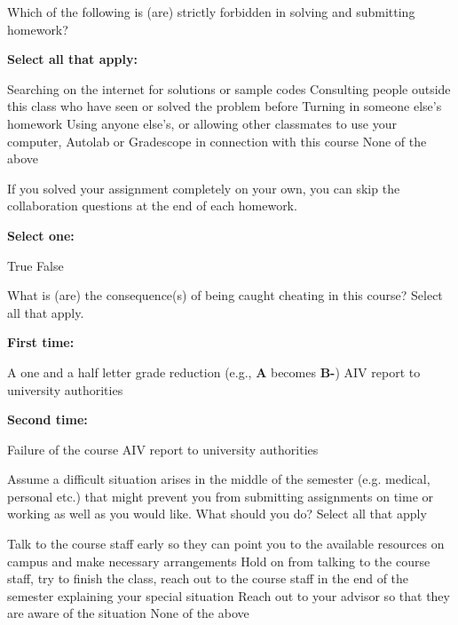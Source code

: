 \documentclass[11pt,addpoints,answers]{exam}
\numberwithin{equation}{section} %
\numberwithin{figure}{section} %
\numberwithin{table}{section} %
\begin{document}
\begin{questions}
    \question[1] Which of the following is (are) strictly forbidden in solving and submitting homework?
    
    \textbf{Select all that apply:}
    \begin{checkboxes}
    {%
    \checkboxchar{$\Box$} \checkedchar{$\blacksquare$}
        \choice Searching on the internet for solutions or sample codes
        \choice Consulting people outside this class who have seen or solved the problem before
        \choice Turning in someone else's homework
        \choice Using anyone else's, or allowing other classmates to use your computer, Autolab or Gradescope in connection with this course
        \choice None of the above
        }
    \end{checkboxes}

    
    \question[1] If you solved your assignment completely on your own, you can skip the collaboration questions at the end of each homework.
    
    \textbf{Select one:}
    \begin{checkboxes}
        \choice True
        \choice False
    \end{checkboxes}

    
    \question[1] What is (are) the consequence(s) of being caught cheating in this course? Select all that apply.
    
    \textbf{First time:}
    \begin{checkboxes}
        {%
    \checkboxchar{$\Box$} \checkedchar{$\blacksquare$}
        \choice A one and a half letter grade reduction (e.g., \textbf{A} becomes \textbf{B-})
        \choice AIV report to university authorities
        }
    \end{checkboxes}

    
    \textbf{Second time:}
    \begin{checkboxes}
            {%
    \checkboxchar{$\Box$} \checkedchar{$\blacksquare$}
        \choice Failure of the course
        \choice AIV report to university authorities
        }
    \end{checkboxes}

\question[1] Assume a difficult situation arises in the middle of the semester (e.g. medical, personal etc.) that might prevent you from submitting assignments on time or working as well as you would like. What should you do? Select all that apply
\begin{checkboxes}
    \checkboxchar{$\Box$} \checkedchar{$\blacksquare$}

\choice Talk to the course staff early so they can point you to the available resources on campus and make necessary arrangements
\choice Hold on from talking to the course staff, try to finish the class, reach out to the course staff in the end of the semester explaining your special situation
\choice Reach out to your advisor so that they are aware of the situation
\choice None of the above
\end{checkboxes}   


\end{questions}
\clearpage
\end{document}
